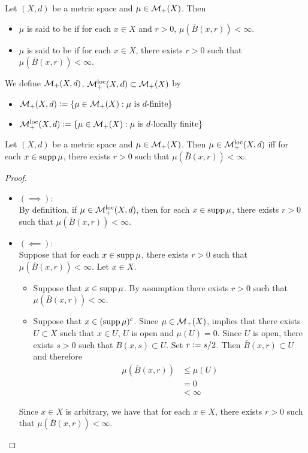 \documentclass{book}
\begin{document}
	\begin{defn} 
		Let $(X, d)$ be a metric space and $\mu \in \mathcal{M}_+(X)$. Then
		\begin{itemize}
			\item $\mu$ is said to be  if for each $x \in X$ and $r > 0$, $\mu(\bar{B}(x, r)) < \infty$. 
			\item  $\mu$ is said to be  if for each $x \in X$, there exists $r > 0$ such that $\mu(\bar{B}(x, r)) < \infty$. 
		\end{itemize}
		We define $\mathcal{M}_+(X, d)$, $\mathcal{M}_+^{\text{loc}}(X, d) \subset \mathcal{M}_+(X)$ by
		\begin{itemize} 
			\item $\mathcal{M}_+(X, d) \vcentcolon= \{\mu \in \mathcal{M}_+(X): \mu \text{ is $d$-finite}\}$
			\item $\mathcal{M}_+^{\text{loc}}(X, d) \vcentcolon= \{\mu \in \mathcal{M}_+(X): \mu \text{ is $d$-locally finite}\}$
		\end{itemize}
	\end{defn}

	\begin{ex} 
		Let $(X, d)$ be a metric space and $\mu \in \mathcal{M}_+(X)$. Then $\mu \in \mathcal{M}_+^{\text{loc}}(X, d)$ iff for each $x \in \operatorname{supp} \mu$, there exists $r > 0$ such that $\mu(\bar{B}(x, r)) < \infty$. 
	\end{ex}

	\begin{proof}\
		\begin{itemize}
			\item $(\implies):$ \\
			By definition, if $\mu \in \mathcal{M}_+^{\text{loc}}(X, d)$, then for each $x \in \operatorname{supp} \mu$, there exists $r > 0$ such that $\mu(\bar{B}(x, r)) < \infty$. 
			\item $(\impliedby):$ \\
			Suppose that for each $x \in \operatorname{supp} \mu$, there exists $r > 0$ such that $\mu(\bar{B}(x, r)) < \infty$. Let $x \in X$. 
			\begin{itemize}
				\item Suppose that $x \in \operatorname{supp} \mu$. By assumption there exists $r > 0$ such that $\mu(\bar{B}(x, r)) < \infty$. 
				\item Suppose that $x \in (\operatorname{supp} \mu)^c$. Since $\mu \in \mathcal{M}_+(X)$,  implies that there exists $U \subset X$ such that $x \in U$, $U$ is open and $\mu(U) = 0$. Since $U$ is open, there exists $s > 0$ such that $B(x, s) \subset U$. Set $r \vcentcolon= s/2$. Then $\bar{B}(x, r) \subset U$ and therefore 
				\begin{align*}
					\mu(\bar{B}(x, r))
					& \leq \mu (U) \\
					& = 0 \\
					& < \infty 
				\end{align*}
			\end{itemize}
			Since $x \in X$ is arbitrary, we have that for each $x \in X$, there exists $r > 0$ such that $\mu(\bar{B}(x, r)) < \infty$.
		\end{itemize}
	\end{proof}
	
\end{document}
